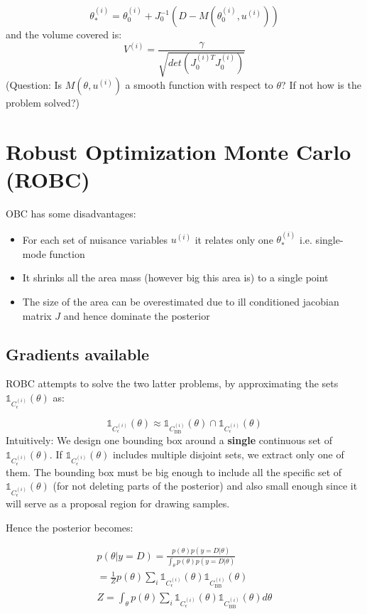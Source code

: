 \documentclass{article}
\begin{document}
\begin{equation}
  \theta_*^{(i)} = \theta_0^{(i)} + J_0^{-1}(D - M(\theta^{(i)}_0, u^{(i)}))
\end{equation}
%
and the volume covered is:
%
\begin{equation}
  V^{(i)} = \frac{\gamma}{\sqrt{det( J_0^{(i)T}J_0^{(i)})}}
\end{equation}
%
(Question: Is $M(\theta, u^{(i)})$ a smooth function with respect to $\theta$? If not how is the problem solved?)

\section{Robust Optimization Monte Carlo (ROBC)}

OBC has some disadvantages:

\begin{itemize}
\item For each set of nuisance variables $u^{(i)}$ it relates only one $\theta_*^{(i)}$ i.e. single-mode function
\item It shrinks all the area mass (however big this area is) to a single point
  \item The size of the area can be overestimated due to ill conditioned jacobian matrix $J$ and hence dominate the posterior
\end{itemize}

\subsection{Gradients available}


ROBC attempts to solve the two latter problems, by approximating the sets $\mathbb{1}_{C_\epsilon^{(i)}}(\theta)$ as:

$$ \mathbb{1}_{C_\epsilon^{(i)}}(\theta) \approx \mathbb{1}_{C_{\text{BB}}^{(i)}}(\theta) \cap \mathbb{1}_{C_\epsilon^{(i)}}(\theta)$$
%
Intuitively: We design one bounding box around a \textbf{single} continuous set of $\mathbb{1}_{C_\epsilon^{(i)}}(\theta)$. If $\mathbb{1}_{C_\epsilon^{(i)}}(\theta)$ includes multiple disjoint sets, we extract only one of them. The bounding box must be big enough to include all the specific set of $\mathbb{1}_{C_\epsilon^{(i)}}(\theta)$ (for not deleting parts of the posterior) and also small enough since it will serve as a proposal region for drawing samples.

Hence the posterior becomes:

\begin{gather} \label{eq:ROBC_posterior}
  p(\theta|y=D) = \frac{p(\theta)p(y=D|\theta)}{\int_\theta p(\theta)p(y=D|\theta)} \\
  = \frac{1}{Z}p(\theta) \sum_i \mathbb{1}_{C_\epsilon^{(i)}}(\theta)\mathbb{1}_{C_{\text{BB}}^{(i)}}(\theta) \\
  Z = \int_\theta p(\theta) \sum_i \mathbb{1}_{C_\epsilon^{(i)}}(\theta)\mathbb{1}_{C_{\text{BB}}^{(i)}}(\theta) d\theta
\end{gather}
\end{document}
